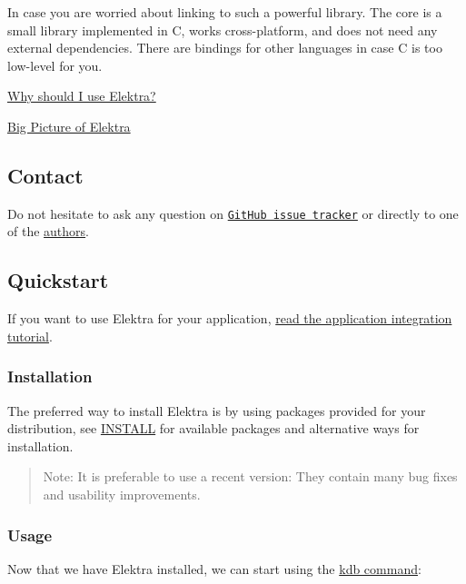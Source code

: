 In case you are worried about linking to such a powerful library. The core is a small library implemented in C, works cross-\/platform, and does not need any external dependencies. There are bindings for other languages in case C is too low-\/level for you.


\begin{DoxyItemize}
\item \hyperlink{doc_WHY_md}{Why should I use Elektra?}
\item \hyperlink{doc_BIGPICTURE_md}{Big Picture of Elektra}
\end{DoxyItemize}

\subsection*{Contact}

Do not hesitate to ask any question on \href{https://issues.libelektra.org/}{\tt Git\+Hub issue tracker} or directly to one of the \hyperlink{doc_AUTHORS_md}{authors}.

\subsection*{Quickstart}

If you want to use Elektra for your application, \hyperlink{doc_tutorials_application-integration_md}{read the application integration tutorial}.

\subsubsection*{Installation}

The preferred way to install Elektra is by using packages provided for your distribution, see \hyperlink{doc_INSTALL_md}{I\+N\+S\+T\+A\+LL} for available packages and alternative ways for installation.

\begin{quote}
Note\+: It is preferable to use a recent version\+: They contain many bug fixes and usability improvements. \end{quote}


\subsubsection*{Usage}

Now that we have Elektra installed, we can start using the \hyperlink{md_doc_help_kdb_doc_help_kdb_md}{kdb command}\+:

